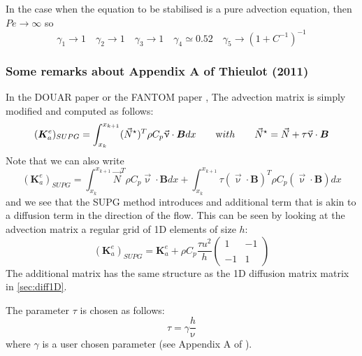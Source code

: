 In the case when the equation to be stabilised is a pure advection equation, 
then $Pe\rightarrow \infty$ so 
\[
\gamma_1 \rightarrow 1  \quad
\gamma_2 \rightarrow 1 \quad
\gamma_3 \rightarrow 1 \quad
\gamma_4 \simeq 0.52 \quad
\gamma_5 \rightarrow (1+C^{-1})^{-1} 
\]






\subsubsection{Some remarks about Appendix A of Thieulot (2011) \cite{thie11}}


In the DOUAR paper \cite{brtf08} or the FANTOM paper \cite{thie11},
The advection matrix is simply modified and computed as follows:
\[
({\bm K}_a^e)_{SUPG}
=
\int_{x_k}^{x_{k+1}}   ({\vec N}^\star)^T \rho C_p \vec\upnu \cdot {\bm B} dx  
\quad\quad
{\text with}
\quad\quad
{\vec N}^\star= {\vec N} + \tau \vec \upnu \cdot {\bm B}
\]
Note that we can also write 
\[
({\bm K}_a^e)_{SUPG}
=
\int_{x_k}^{x_{k+1}}   {\vec N}^T \rho C_p \vec\upnu \cdot {\bm B} dx  
+
\int_{x_k}^{x_{k+1}}  \tau (\vec \upnu \cdot {\bm B})^T   \rho C_p (\vec\upnu \cdot {\bm B}) dx  
\]
and we see that the SUPG method introduces and additional term that is akin to 
a diffusion term in the direction of the flow.
This can be seen by looking at the advection matrix a regular grid of 1D 
elements of size $h$:
\[
({\bm K}_a^e)_{SUPG}=
{\bm K}_a^e
+
\rho C_p
\frac{\tau u^2}{h}
\left(
\begin{array}{cc}
1 & -1 \\ \\
-1 & 1
\end{array}
\right)
\]
The additional matrix has the same structure as the 1D diffusion matrix matrix in \ref{sec:diff1D}.

The parameter $\tau$ is chosen as follows:
\begin{equation}
\tau=\gamma \frac{h}{\upnu} 
\label{tausupg}
\end{equation}
where $\gamma$ is a user chosen parameter (see Appendix A of \cite{thie11}). 

